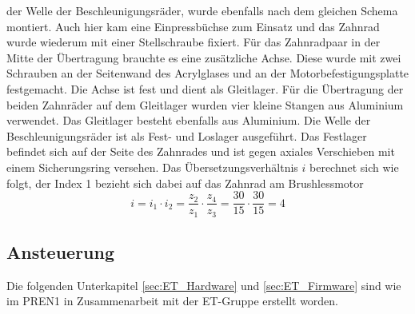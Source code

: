         der Welle der Beschleunigungsräder, wurde ebenfalls nach dem gleichen Schema 
        montiert. Auch hier kam eine Einpressbüchse zum Einsatz und das Zahnrad wurde wiederum mit 
        einer Stellschraube fixiert. Für das Zahnradpaar in der Mitte der Übertragung brauchte es eine 
        zusätzliche Achse. Diese wurde mit zwei Schrauben an der Seitenwand des 
        Acrylglases und an der Motorbefestigungsplatte festgemacht. Die Achse ist fest und dient als 
        Gleitlager. Für die Übertragung der beiden Zahnräder auf dem Gleitlager wurden vier kleine Stangen 
        aus Aluminium verwendet. Das Gleitlager besteht ebenfalls aus Aluminium. Die Welle der 
        Beschleunigungsräder ist als Fest- und Loslager ausgeführt. Das Festlager befindet sich auf 
        der Seite des Zahnrades und ist gegen axiales Verschieben mit einem Sicherungsring versehen. 
        Das Übersetzungsverhältnis $i$ berechnet sich wie folgt, der Index 1 bezieht sich dabei auf 
        das Zahnrad am Brushlessmotor
        \begin{equation}
            i = i_1 \cdot i_2 = \frac{z_2}{z_1} \cdot \frac{z_4}{z_3} = \frac{30}{15} \cdot \frac{30}{15} = 4
        \end{equation}
%
\subsection{Ansteuerung}
Die folgenden Unterkapitel \ref{sec:ET_Hardware} und \ref{sec:ET_Firmware} sind wie im PREN1 \cite{Team32:Doku} in Zusammenarbeit mit der ET-Gruppe erstellt worden. 



